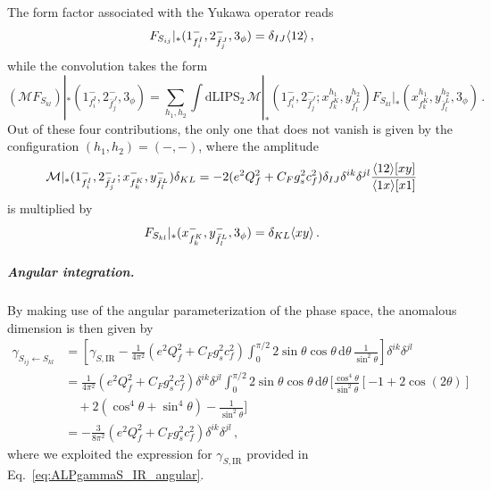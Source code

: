 The form factor associated with the Yukawa operator reads
\begin{equation}
    F_{S_{ij}}|_*(1_{f_i^I}^-,2_{\bar f_j^J}^-,3_\phi) = \delta_{IJ}\langle 1 2 \rangle\,,
\end{equation}
while the convolution takes the form
\begin{equation}
    (\mathcal M F_{S_{kl}})|_*(1_{f_i^I}^-,2_{\bar f_j^J}^-,3_\phi) = \sum_{h_1,h_2}\int \text{dLIPS}_2\,
    \mathcal M|_*(1_{f_i^I}^-,2_{\bar f_j^J}^-;x^{h_1}_{f_k^K},y^{h_2}_{\bar f_l^L})
    F_{S_{kl}}|_*(x^{h_1}_{f_k^K},y^{h_2}_{\bar f_l^L},3_\phi)\,.
\end{equation}
Out of these four contributions, the only one that does not vanish is given by the
configuration $(h_1,h_2)=(-,-)$, where the amplitude
\begin{equation}
    \mathcal M|_*(1_{f_i^I}^-,2_{\bar f_j^J}^-;x^{-}_{f_k^K},y^{-}_{\bar f_l^L}) \delta_{KL}= -2(e^2Q_f^2+C_Fg_s^2c_f^2)\delta_{IJ}\delta^{ik}\delta^{jl}\frac{\langle 1 2 \rangle\lbrack x y \rbrack}{\langle 1 x \rangle\lbrack x 1 \rbrack}
\end{equation}
is multiplied by
\begin{equation}
    F_{S_{kl}}|_*(x^{-}_{f_k^K},y^{-}_{\bar f_l^L},3_\phi) = \delta_{KL}\langle x y \rangle\,.
\end{equation}

\subparagraph{Angular integration.}
By making use of the angular parameterization of the phase space, the anomalous dimension is
then given by
\begin{align}
    \gamma_{S_{ij}\leftarrow S_{kl}}&=\left[\gamma_{S,\text{IR}}-\frac{1}{4\pi^2}(e^2Q_f^2+C_Fg_s^2c_f^2)\int_0^{\pi/2}2\sin\theta\cos\theta \,\text{d}\theta\,\frac{1}{\sin^2\theta}\right]\delta^{ik}\delta^{jl}\nonumber \\
    &= \frac{1}{4\pi^2}(e^2Q_f^2+C_Fg_s^2c_f^2)\delta^{ik}\delta^{jl}
    \int_0^{\pi/2}2\sin\theta\cos\theta \,\text{d}\theta\,\bigg[\frac{\cos^4\theta}{\sin^2\theta}[-1+2\cos(2\theta)]\nonumber\\&\quad +2(\cos^4\theta + \sin^4\theta)-\frac{1}{\sin^2\theta}\bigg]\nonumber \\
    &= -\frac{3}{8\pi^2}(e^2Q_f^2+C_Fg_s^2c_f^2)\delta^{ik}\delta^{jl} \,,
\end{align}
where we exploited the expression for $\gamma_{S,\text{IR}}$ provided in
Eq.~\eqref{eq:ALPgammaS_IR_angular}.

